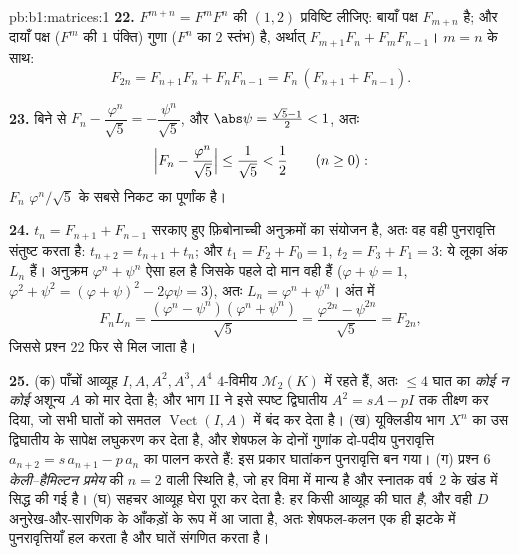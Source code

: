 \begin{solution}{pb:b1:matrices:1}
\textbf{22.} $F^{m+n} = F^m F^n$ की $(1,2)$ प्रविष्टि लीजिए: बायाँ पक्ष
$F_{m+n}$ है; और दायाँ पक्ष ($F^m$ की $1$ पंक्ति) गुणा ($F^n$ का $2$ स्तंभ)
है, अर्थात् $F_{m+1}F_n + F_m F_{n-1}$। $m = n$ के साथ:
\[
F_{2n} = F_{n+1}F_n + F_nF_{n-1} = F_n\,(F_{n+1} + F_{n-1}).
\]

\textbf{23.} बिने से $F_n - \dfrac{\varphi^n}{\sqrt5} =
-\dfrac{\psi^n}{\sqrt5}$, और $\abs\psi = \frac{\sqrt5 - 1}2 < 1$, अतः
\[
\Bigl|F_n - \frac{\varphi^n}{\sqrt5}\Bigr|
\leq \frac{1}{\sqrt5} < \frac12
\qquad (n \geq 0):
\]
$F_n$ $\varphi^n/\sqrt5$ के सबसे निकट का पूर्णांक है।

\textbf{24.} $t_n = F_{n+1} + F_{n-1}$ सरकाए हुए फ़िबोनाच्ची अनुक्रमों का
संयोजन है, अतः वह वही पुनरावृत्ति संतुष्ट करता है: $t_{n+2} = t_{n+1} +
t_n$; और $t_1 = F_2 + F_0 = 1$, $t_2 = F_3 + F_1 = 3$: ये लूका अंक $L_n$
हैं। अनुक्रम $\varphi^n + \psi^n$ ऐसा हल है जिसके पहले दो मान वही हैं
($\varphi + \psi = 1$, $\varphi^2 + \psi^2 = ( \varphi + \psi)^2 -
2\varphi\psi = 3$), अतः $L_n = \varphi^n + \psi^n$। अंत में
\[
F_n L_n = \frac{(\varphi^n - \psi^n)(\varphi^n +
\psi^n)}{\sqrt5} = \frac{\varphi^{2n} - \psi^{2n}}{\sqrt5} =
F_{2n},
\]
जिससे प्रश्न 22 फिर से मिल जाता है।

\textbf{25.} (क) पाँचों आव्यूह $I, A, A^2, A^3, A^4$ $4$-विमीय
$\mathcal{M}_2(K)$ में रहते हैं, अतः $\leq 4$ घात का \emph{कोई न कोई} अशून्य
 $A$ को मार देता है; और भाग II ने इसे स्पष्ट द्विघातीय $A^2 = sA - pI$
तक तीक्ष्ण कर दिया, जो सभी घातों को समतल $\operatorname{Vect}(I, A)$ में बंद
कर देता है। (ख) यूक्लिडीय भाग $X^n$ का उस द्विघातीय के सापेक्ष लघुकरण कर
देता है, और शेषफल के दोनों गुणांक दो-पदीय पुनरावृत्ति $a_{n+2} = s\,a_{n+1}
- p\,a_n$ का पालन करते हैं: इस प्रकार घातांकन पुनरावृत्ति बन गया। (ग) प्रश्न
6 \emph{केली--हैमिल्टन प्रमेय} की $n = 2$ वाली स्थिति है, जो हर विमा में
मान्य है और स्नातक वर्ष~2 के खंड में सिद्ध की गई है। (घ) सहचर आव्यूह घेरा
पूरा कर देता है: हर  किसी आव्यूह की घात \emph{है}, और वही
 $D$ अनुरेख-और-सारणिक के आँकड़ों के रूप में आ जाता है, अतः शेषफल-कलन एक
ही झटके में पुनरावृत्तियाँ हल करता है और घातें संगणित करता है।
\end{solution}
